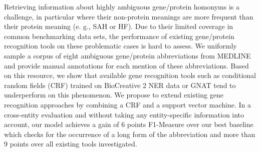 Retrieving information about highly ambiguous gene/protein homonyms is a challenge, in particular where their non-protein meanings are more frequent than their protein meaning (e. g., SAH or HF). Due to their limited coverage in common benchmarking data sets, the performance of existing gene/protein recognition tools on these problematic cases is hard to assess. We uniformly sample a corpus of eight ambiguous gene/protein abbreviations from MEDLINE and provide manual annotations for each mention of these abbreviations. Based on this resource, we show that available gene recognition tools such as conditional random fields (CRF) trained on BioCreative 2 NER data or GNAT tend to underperform on this phenomenon. We propose to extend existing gene recognition approaches by combining a CRF and a support vector machine. In a cross-entity evaluation and without taking any entity-specific information into account, our model achieves a gain of 6 points F1-Measure over our best baseline which checks for the occurrence of a long form of the abbreviation and more than 9 points over all existing tools investigated.
